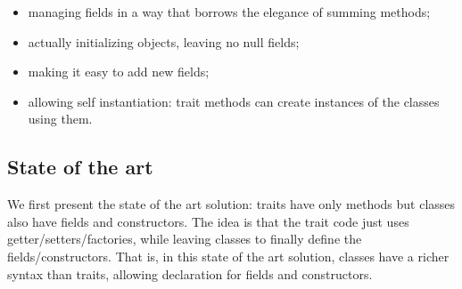 \begin{itemize}
\item managing fields in a way that borrows the elegance of summing methods;
\item actually initializing objects, leaving no null fields;
\item making it easy to add new fields;
\item allowing self instantiation: trait methods can create instances of the classes using them.
\end{itemize}
\subsection{State of the art}
We first present the state of the art solution: 
traits have only methods but classes also have fields and constructors.
The idea is that the trait code just uses getter/setters/factories, while leaving
classes to finally define the fields/constructors. That
is, in this state of the art solution, classes have a richer syntax than traits, allowing
declaration for fields and constructors. 

